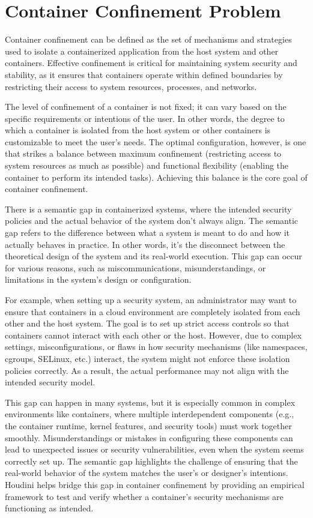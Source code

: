 \section{Container Confinement Problem}
\label{sec:confinement}

Container confinement can be defined as the set of mechanisms and strategies used to isolate a containerized application from the host system and other containers. Effective confinement is critical for maintaining system security and stability, as it ensures that containers operate within defined boundaries by restricting their access to system resources, processes, and networks. 

The level of confinement of a container is not fixed; it can vary based on the specific requirements or intentions of the user. In other words, the degree to which a container is isolated from the host system or other containers is customizable to meet the user’s needs. The optimal configuration, however, is one that strikes a balance between maximum confinement (restricting access to system resources as much as possible) and functional flexibility (enabling the container to perform its intended tasks). Achieving this balance is the core goal of container confinement. 


There is a semantic gap in containerized systems, where the intended security policies and the actual behavior of the system don't always align. The semantic gap refers to the difference between what a system is meant to do and how it actually behaves in practice. In other words, it’s the disconnect between the theoretical design of the system and its real-world execution. This gap can occur for various reasons, such as miscommunications, misunderstandings, or limitations in the system's design or configuration.

For example, when setting up a security system, an administrator may want to ensure that containers in a cloud environment are completely isolated from each other and the host system. The goal is to set up strict access controls so that containers cannot interact with each other or the host. However, due to complex settings, misconfigurations, or flaws in how security mechanisms (like namespaces, cgroups, SELinux, etc.) interact, the system might not enforce these isolation policies correctly. As a result, the actual performance may not align with the intended security model.

This gap can happen in many systems, but it is especially common in complex environments like containers, where multiple interdependent components (e.g., the container runtime, kernel features, and security tools) must work together smoothly. Misunderstandings or mistakes in configuring these components can lead to unexpected issues or security vulnerabilities, even when the system seems correctly set up. The semantic gap highlights the challenge of ensuring that the real-world behavior of the system matches the user’s or designer’s intentions. Houdini helps bridge this gap in container confinement by providing an empirical framework to test and verify whether a container’s security mechanisms are functioning as intended.




